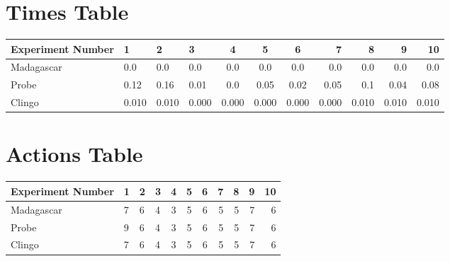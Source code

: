 \documentclass[8pt]{article}
\begin{document}
\begin{landscape}
\section{Times Table}\begin{tabular}{ | l | l | l | l | c | c | c | r | r | r | r | }\hline
Experiment Number & 1 & 2 & 3 & 4 & 5 & 6 & 7 & 8 & 9 & 10\\  \hline
Madagascar & 0.0 & 0.0 & 0.0 & 0.0 & 0.0 & 0.0 & 0.0 & 0.0 & 0.0 & 0.0\\  \hline
Probe & 0.12 & 0.16 & 0.01 & 0.0 & 0.05 & 0.02 & 0.05 & 0.1 & 0.04 & 0.08\\  \hline
Clingo & 0.010 & 0.010 & 0.000 & 0.000 & 0.000 & 0.000 & 0.000 & 0.010 & 0.010 & 0.010\\  \hline
\end{tabular}
\section{Actions Table}\begin{tabular}{ | l | l | l | l | c | c | c | r | r | r | r | }\hline
Experiment Number & 1 & 2 & 3 & 4 & 5 & 6 & 7 & 8 & 9 & 10\\ \hline
 Madagascar & 7 & 6 & 4 & 3 & 5 & 6 & 5 & 5 & 7 & 6\\ \hline
 Probe & 9 & 6 & 4 & 3 & 5 & 6 & 5 & 5 & 7 & 6\\ \hline
 Clingo & 7 & 6 & 4 & 3 & 5 & 6 & 5 & 5 & 7 & 6\\ \hline
\end{tabular}
\end{landscape}
\end{document}
